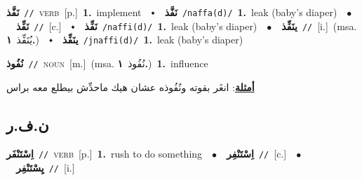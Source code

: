 \documentclass[10pt,a4paper,twoside]{article} %
\begin{document}
\begin{multicols}{2}
{\setlength\topsep{0pt}\textbf{\foreignlanguage{arabic}{نَفَّذ}}\ {\color{gray}\texttt{//}\color{black}}\ \textsc{verb}\ [p.]\ \textbf{1.}~implement\ \ $\smblkdiamond$\ \ \setlength\topsep{0pt}\textbf{\foreignlanguage{arabic}{نَفَّذ}}\ {\color{gray}\texttt{/naffa(d)/}\color{black}}\ \textbf{1.}~leak (baby's diaper)\ \ $\bullet$\ \ \setlength\topsep{0pt}\textbf{\foreignlanguage{arabic}{نَفِّذ}}\ {\color{gray}\texttt{//}\color{black}}\ [c.]\ \ $\smblkdiamond$\ \ \setlength\topsep{0pt}\textbf{\foreignlanguage{arabic}{نَفِّذ}}\ {\color{gray}\texttt{/naffi(d)/}\color{black}}\ \textbf{1.}~leak (baby's diaper)\ \ $\bullet$\ \ \setlength\topsep{0pt}\textbf{\foreignlanguage{arabic}{ينَفِّذ}}\ {\color{gray}\texttt{//}\color{black}}\ [i.]\ \color{gray}(msa. \foreignlanguage{arabic}{يُنَفِّذ}~\foreignlanguage{arabic}{\textbf{١.}})\color{black}\ \ $\smblkdiamond$\ \ \setlength\topsep{0pt}\textbf{\foreignlanguage{arabic}{ينَفِّذ}}\ {\color{gray}\texttt{/jnaffi(d)/}\color{black}}\ \textbf{1.}~leak (baby's diaper)\ } \vspace{2mm}

{\setlength\topsep{0pt}\textbf{\foreignlanguage{arabic}{نُفُوذ}}\ {\color{gray}\texttt{//}\color{black}}\ \textsc{noun}\ [m.]\ \color{gray}(msa. \foreignlanguage{arabic}{نُفُوذ}~\foreignlanguage{arabic}{\textbf{١.}})\color{black}\ \textbf{1.}~influence\  \begin{flushright}\color{gray}\foreignlanguage{arabic}{\textbf{\underline{\foreignlanguage{arabic}{أمثلة}}}: انغَر بقوته ونُفُوذه عشان هيك ماحدِّش بيطلع معه براس}\end{flushright}\color{black}} \vspace{2mm}

\vspace{-3mm}
\subsection*{\color{blue}\foreignlanguage{arabic}{ن.ف.ر}\color{blue}{}} 

{\setlength\topsep{0pt}\textbf{\foreignlanguage{arabic}{اِسْتَنْفَر}}\ {\color{gray}\texttt{//}\color{black}}\ \textsc{verb}\ [p.]\ \textbf{1.}~rush to do something\ \ $\bullet$\ \ \setlength\topsep{0pt}\textbf{\foreignlanguage{arabic}{اِسْتَنْفِر}}\ {\color{gray}\texttt{//}\color{black}}\ [c.]\ \ $\bullet$\ \ \setlength\topsep{0pt}\textbf{\foreignlanguage{arabic}{يِسْتَنْفِر}}\ {\color{gray}\texttt{//}\color{black}}\ [i.]\ } \vspace{2mm}


\end{multicols}
\end{document}
